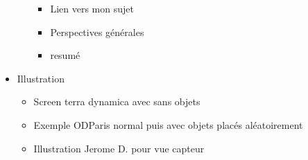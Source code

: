 \begin{itemize}
\begin{itemize}
	       	\begin{itemize}\itemsep0.1pt
	       		\item Lien vers mon sujet
	      		\item Perspectives générales
	       		\item resumé
       	 \end{itemize}
  \end{itemize}
  \item Illustration
  \begin{itemize}\itemsep0.1pt  
  		       		\item Screen terra dynamica avec sans objets
  		       		\item Exemple ODParis normal puis avec objets placés aléatoirement
  		       		\item Illustration Jerome D. pour vue capteur
      		\end{itemize}
	\end{itemize}
 

\newpage


\newpage
